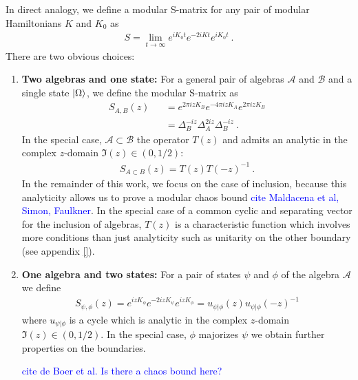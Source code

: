 \documentclass[a4paper,11pt]{article}
\theoremstyle{definition}
\newcommand{\mA}{\mathcal{A}}
\newcommand{\mB}{\mathcal{B}}
\newcommand{\nn}{\nonumber}
\newcommand{\NL}[1]{\textcolor{blue}{#1}}
\begin{document}
In direct analogy, we define a modular S-matrix for any pair of modular Hamiltonians $K$ and $K_0$ as 
\begin{eqnarray}
S=\lim_{t\to \infty} e^{i K_0t} e^{-2i Kt} e^{i K_0t}\ .
\end{eqnarray}
There are two obvious choices: 
\begin{enumerate}
\item {\bf Two algebras and one state:} For a general pair of algebras $\mA$ and $\mB$ and a single state $\ket{\Omega}$, we define the modular S-matrix as 
\begin{eqnarray}
S_{A,B}(z)&&=e^{2\pi i z K_B }e^{-4\pi i z K_A}e^{2\pi i z K_B}\nn\\
&&=\Delta_B^{-iz}\Delta_A^{2iz}\Delta_B^{-iz}\ .
\end{eqnarray}
In the special case, $\mA\subset \mB$ the operator $T(z)$ and admits an analytic in the complex $z$-domain $\Im(z)\in (0,1/2)$: 
\begin{eqnarray}
    S_{A\subset B}(z)=T(z)T(-z)^{-1}\ .
\end{eqnarray}
In the remainder of this work, we focus on the case of inclusion, because this analyticity allows us to prove a modular chaos bound \NL{cite Maldacena et al, Simon, Faulkner}. In the special case of a common cyclic and separating vector for the inclusion of algebras, $T(z)$ is a characteristic function which involves more conditions than just analyticity such as unitarity on the other boundary (see appendix \ref{}).

\item {\bf One algebra and two states:} For a pair of states $\psi$ and $\phi$ of the algebra $\mA$ we define
\begin{eqnarray}
S_{\psi,\phi}(z)=e^{i z K_\phi} e^{-2i z K_\psi}e^{i z K_\phi}=u_{\psi|\phi}(z)u_{\psi|\phi}(-z)^{-1}
\end{eqnarray}
where $u_{\psi|\phi}$ is a cycle which is analytic in the complex $z$-domain $\Im(z)\in (0,1/2)$. In the special case, $\phi$ majorizes $\psi$ we obtain further properties on the boundaries.

\NL{cite de Boer et al.} \NL{Is there a chaos bound here?}
\end{enumerate}
\end{document}
